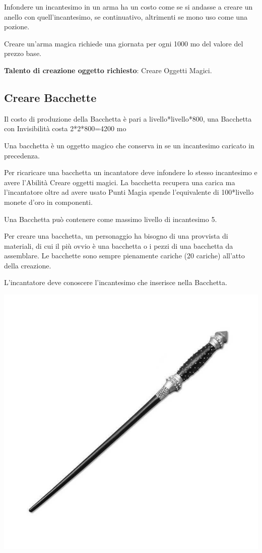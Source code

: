 \begin{multicols}{2}
	Infondere un incantesimo in un arma ha un costo come se si andasse a creare un anello con quell'incantesimo, se continuativo, altrimenti se mono uso come una pozione.

	Creare un'arma magica richiede una giornata per ogni 1000 mo del valore del prezzo base.

	\medskip

	\textbf{Talento di creazione oggetto richiesto}: Creare Oggetti Magici.

	\subsection{Creare Bacchette}

	Il costo di produzione della Bacchetta è pari a livello*livello*800, una Bacchetta con Invisibilità costa 2*2*800=4200 mo

	Una bacchetta è un oggetto magico che conserva in se un incantesimo caricato in precedenza.

	Per ricaricare una bacchetta un incantatore deve infondere lo stesso incantesimo e avere l'Abilità Creare oggetti magici. La bacchetta recupera una carica ma l'incantatore oltre ad avere usato Punti Magia spende l'equivalente di 100*livello monete d'oro in componenti.

	Una Bacchetta può contenere come massimo livello di incantesimo 5.

	Per creare una bacchetta, un personaggio ha bisogno di una provvista di materiali, di cui il più ovvio è una bacchetta o i pezzi di una bacchetta da assemblare. Le bacchette sono sempre pienamente cariche (20 cariche) all'atto della creazione.

	L'incantatore deve conoscere l'incantesimo che inserisce nella Bacchetta.

	\begin{center}
		\includegraphics[width=0.5\linewidth]{immagini/wand.png}
	\end{center}


\end{multicols}
